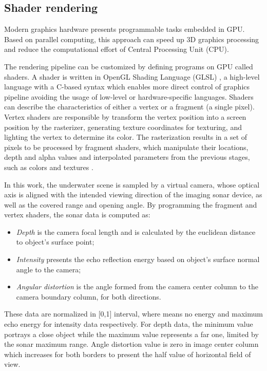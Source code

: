 \documentclass[final,5p,times]{elsarticle}
\begin{document}

\subsection{Shader rendering}
\label{dev:shader}

Modern graphics hardware presents programmable tasks embedded in GPU. Based on parallel computing, this approach can speed up 3D graphics processing and reduce the computational effort of Central Processing Unit (CPU).

The rendering pipeline can be customized by defining programs on GPU called shaders. A shader is written in OpenGL Shading Language (GLSL) \cite{rost2009}, a high-level language with a C-based syntax which enables more direct control of graphics pipeline avoiding the usage of low-level or hardware-specific languages. Shaders can describe the characteristics of either a vertex or a fragment (a single pixel). Vertex shaders are responsible by transform the vertex position into a screen position by the rasterizer, generating texture coordinates for texturing, and lighting the vertex to determine its color. The rasterization results in a set of pixels to be processed by fragment shaders, which manipulate their locations, depth and alpha values and interpolated parameters from the previous stages, such as colors and textures \cite{fernando2003}.

In this work, the underwater scene is sampled by a virtual camera, whose optical axis is aligned with the intended viewing direction of the imaging sonar device, as well as the covered range and opening angle. By programming the fragment and vertex shaders, the sonar data is computed as:

\begin{itemize}[(a)]
    \item \textit{Depth} is the camera focal length and is calculated by the euclidean distance to object's surface point;
    \item \textit{Intensity} presents the echo reflection energy based on object's surface normal angle to the camera;
    \item \textit{Angular distortion} is the angle formed from the camera center column to the camera boundary column, for both directions.
\end{itemize}

These data are normalized in [0,1] interval, where means no energy and maximum echo energy for intensity data respectively. For depth data, the minimum value portrays a close object while the maximum value represents a far one, limited by the sonar maximum range. Angle distortion value is zero in image center column which increases for both borders to present the half value of horizontal field of view.
\end{document}
